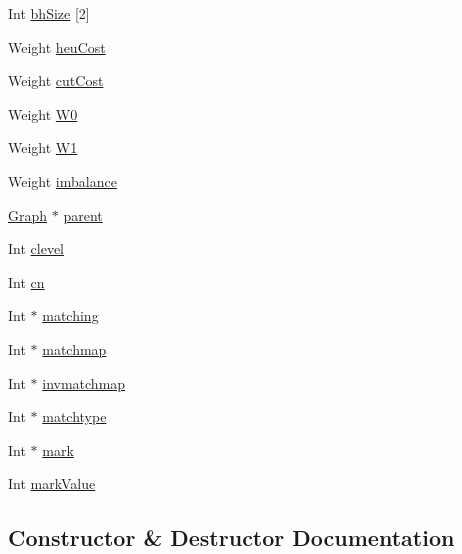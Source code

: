 \begin{DoxyCompactItemize}
\item 
Int \hyperlink{class_mongoose_1_1_graph_aafe78f0432fa8964d9890e151094b6fc}{bh\+Size} \mbox{[}2\mbox{]}
\item 
Weight \hyperlink{class_mongoose_1_1_graph_ae4a5a338b693910d94884ff817cfc5de}{heu\+Cost}
\item 
Weight \hyperlink{class_mongoose_1_1_graph_aff1e7ee84f684c3966f1b87a1138b5f8}{cut\+Cost}
\item 
Weight \hyperlink{class_mongoose_1_1_graph_af756e0f14f39b560eb8055b89ae69e36}{W0}
\item 
Weight \hyperlink{class_mongoose_1_1_graph_a3bcc918160fe54041c2da7d3837076de}{W1}
\item 
Weight \hyperlink{class_mongoose_1_1_graph_a42f86f519bb3f579131cbd4b95949caa}{imbalance}
\item 
\hyperlink{class_mongoose_1_1_graph}{Graph} $\ast$ \hyperlink{class_mongoose_1_1_graph_ae3fa91e7453224cdf98cc3088becaba4}{parent}
\item 
Int \hyperlink{class_mongoose_1_1_graph_a818aebc0f65b8d35b81c71c61f4f87d6}{clevel}
\item 
Int \hyperlink{class_mongoose_1_1_graph_a1a922066f6afd660db26a8b7f8f87427}{cn}
\item 
Int $\ast$ \hyperlink{class_mongoose_1_1_graph_aad78361401a6429fa93ae34d511f58f8}{matching}
\item 
Int $\ast$ \hyperlink{class_mongoose_1_1_graph_af5a8e35dd4efe2b4f26bfb1f8b8bb6e3}{matchmap}
\item 
Int $\ast$ \hyperlink{class_mongoose_1_1_graph_a2f26902e9aa3aa9e29088da9af230a9b}{invmatchmap}
\item 
Int $\ast$ \hyperlink{class_mongoose_1_1_graph_a5d445d5006d859ea6587b3dd55d948e1}{matchtype}
\item 
Int $\ast$ \hyperlink{class_mongoose_1_1_graph_a09b695589f11535afebda107c703cb4e}{mark}
\item 
Int \hyperlink{class_mongoose_1_1_graph_a29d1189b1c70bd6911ac1436407eb6a5}{mark\+Value}
\end{DoxyCompactItemize}


\subsection{Constructor \& Destructor Documentation}
\hypertarget{class_mongoose_1_1_graph_ae3987e9b47b7f787724bafd7309b8594}{}\label{class_mongoose_1_1_graph_ae3987e9b47b7f787724bafd7309b8594} 
